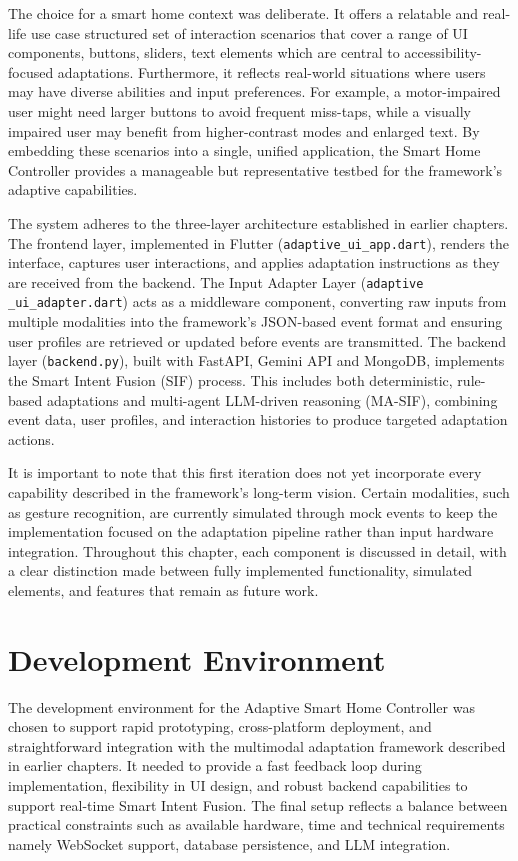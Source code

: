 \documentclass[openany]{book}
\begin{document}
The choice for a smart home context was deliberate. It offers a relatable and real-life use case structured set of interaction scenarios that cover a range of UI components, buttons, sliders, text elements which are central to accessibility-focused adaptations. Furthermore, it reflects real-world situations where users may have diverse abilities and input preferences. For example, a motor-impaired user might need larger buttons to avoid frequent miss-taps, while a visually impaired user may benefit from higher-contrast modes and enlarged text. By embedding these scenarios into a single, unified application, the Smart Home Controller provides a manageable but representative testbed for the framework’s adaptive capabilities.

The system adheres to the three-layer architecture established in earlier chapters. The frontend layer, implemented in Flutter (\texttt{adaptive\_ui\_app.dart}), renders the interface, captures user interactions, and applies adaptation instructions as they are received from the backend. The Input Adapter Layer (\texttt{adaptive\\\_ui\_adapter.dart}) acts as a middleware component, converting raw inputs from multiple modalities into the framework’s JSON-based event format and ensuring user profiles are retrieved or updated before events are transmitted. The backend layer (\texttt{backend.py}), built with FastAPI, Gemini API and MongoDB, implements the Smart Intent Fusion (SIF) process. This includes both deterministic, rule-based adaptations and multi-agent LLM-driven reasoning (MA-SIF), combining event data, user profiles, and interaction histories to produce targeted adaptation actions.

It is important to note that this first iteration does not yet incorporate every capability described in the framework’s long-term vision. Certain modalities, such as gesture recognition, are currently simulated through mock events to keep the implementation focused on the adaptation pipeline rather than input hardware integration. Throughout this chapter, each component is discussed in detail, with a clear distinction made between fully implemented functionality, simulated elements, and features that remain as future work.

\section{Development Environment}
The development environment for the Adaptive Smart Home Controller was chosen to support rapid prototyping, cross-platform deployment, and straightforward integration with the multimodal adaptation framework described in earlier chapters. It needed to provide a fast feedback loop during implementation, flexibility in UI design, and robust backend capabilities to support real-time Smart Intent Fusion. The final setup reflects a balance between practical constraints such as available hardware, time and technical requirements namely WebSocket support, database persistence, and LLM integration.
\end{document}
